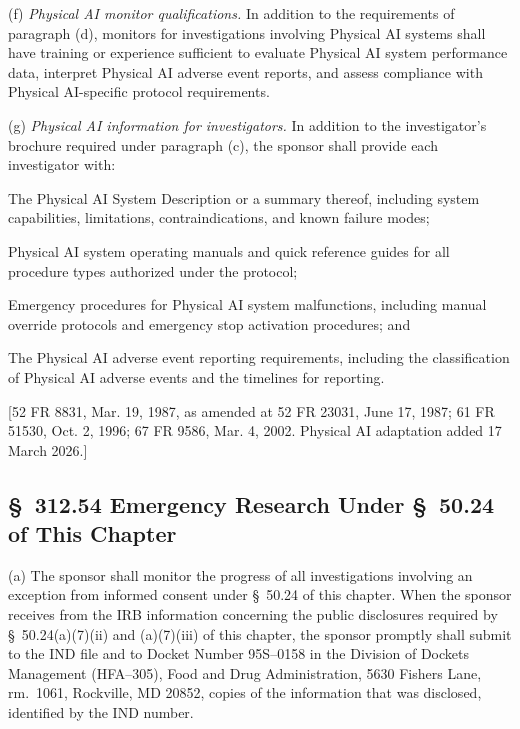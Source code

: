 (f) \textit{Physical AI monitor qualifications.} In addition to the requirements of paragraph (d), monitors for investigations involving Physical AI systems shall have training or experience sufficient to evaluate Physical AI system performance data, interpret Physical AI adverse event reports, and assess compliance with Physical AI-specific protocol requirements.

(g) \textit{Physical AI information for investigators.} In addition to the investigator's brochure required under paragraph (c), the sponsor shall provide each investigator with:

\begin{description}[leftmargin=0.8cm,style=sameline]
\item[(i)] The Physical AI System Description or a summary thereof, including system capabilities, limitations, contraindications, and known failure modes;
\item[(ii)] Physical AI system operating manuals and quick reference guides for all procedure types authorized under the protocol;
\item[(iii)] Emergency procedures for Physical AI system malfunctions, including manual override protocols and emergency stop activation procedures; and
\item[(iv)] The Physical AI adverse event reporting requirements, including the classification of Physical AI adverse events and the timelines for reporting.
\end{description}

[52 FR 8831, Mar. 19, 1987, as amended at 52 FR 23031, June 17, 1987; 61 FR 51530, Oct. 2, 1996; 67 FR 9586, Mar. 4, 2002. Physical AI adaptation added 17 March 2026.]

\subsection{\S~312.54 Emergency Research Under \S~50.24 of This Chapter}

(a) The sponsor shall monitor the progress of all investigations involving an exception from informed consent under \S~50.24 of this chapter. When the sponsor receives from the IRB information concerning the public disclosures required by \S~50.24(a)(7)(ii) and (a)(7)(iii) of this chapter, the sponsor promptly shall submit to the IND file and to Docket Number 95S--0158 in the Division of Dockets Management (HFA--305), Food and Drug Administration, 5630 Fishers Lane, rm.~1061, Rockville, MD 20852, copies of the information that was disclosed, identified by the IND number.

